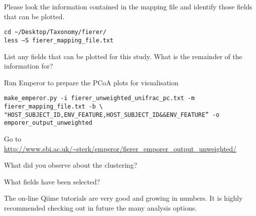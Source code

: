 Please look the information contained in the mapping file and identify those fields that can be plotted. 

\begin{steps}
\begin{lstlisting}
cd ~/Desktop/Taxonomy/fierer/
less –S fierer_mapping_file.txt
\end{lstlisting}
\end{steps}

\begin{questions}
List any fields that can be plotted for this study. What is the remainder of the information for?
\begin{answer}


\end{answer}
\end{questions}

Run Emperor to prepare the PCoA plots for visualisation
\begin{steps}
\begin{lstlisting}
make_emperor.py -i fierer_unweighted_unifrac_pc.txt -m fierer_mapping_file.txt -b \ "HOST_SUBJECT_ID,ENV_FEATURE,HOST_SUBJECT_ID&&ENV_FEATURE” -o emporer_output_unweighted
\end{lstlisting}
\end{steps}

\begin{steps}
Go to \url{http://www.ebi.ac.uk/~sterk/emperor/fierer_emporer_output_unweighted/}
\end{steps}

\begin{questions}
What did you observe about the clustering?
\begin{answer}

\end{answer}
\end{questions}

\begin{questions}
What fields have been selected?
\begin{answer}

\end{answer}
\end{questions}

\begin{note}
The on-line Qiime tutorials are very good and growing in numbers. It is highly recommended checking out in future the many analysis options.
\end{note}

